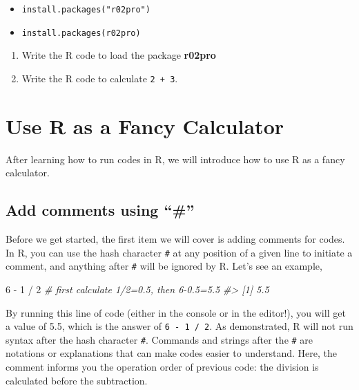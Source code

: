 \documentclass[
]{book}
\newenvironment{Shaded}{\begin{snugshade}}{\end{snugshade}}
\newcommand{\CommentTok}[1]{\textcolor[rgb]{0.56,0.35,0.01}{\textit{#1}}}
\newcommand{\DecValTok}[1]{\textcolor[rgb]{0.00,0.00,0.81}{#1}}
\newcommand{\SpecialCharTok}[1]{\textcolor[rgb]{0.00,0.00,0.00}{#1}}
\providecommand{\tightlist}{%
  \setlength{\itemsep}{0pt}\setlength{\parskip}{0pt}}
\begin{document}
\begin{itemize}
\tightlist
\item
  \texttt{install.packages("r02pro")}
\item
  \texttt{install.packages(r02pro)}
\end{itemize}

\begin{enumerate}
\def\labelenumi{\arabic{enumi}.}
\setcounter{enumi}{1}
\item
  Write the R code to load the package \textbf{r02pro}
\item
  Write the R code to calculate \texttt{2\ +\ 3}.
\end{enumerate}

\hypertarget{Calculator}{%
\section{Use R as a Fancy Calculator}\label{Calculator}}

After learning how to run codes in R, we will introduce how to use R as a fancy calculator.

\hypertarget{add-comments-using}{%
\subsection{Add comments using ``\#''}\label{add-comments-using}}

Before we get started, the first item we will cover is adding comments for codes. In R, you can use the hash character \texttt{\#} at any position of a given line to initiate a comment, and anything after \texttt{\#} will be ignored by R. Let's see an example,

\begin{Shaded}
\begin{Highlighting}[]
\DecValTok{6} \SpecialCharTok{{-}} \DecValTok{1} \SpecialCharTok{/} \DecValTok{2} \CommentTok{\# first calculate 1/2=0.5, then 6{-}0.5=5.5}
\CommentTok{\#\textgreater{} [1] 5.5}
\end{Highlighting}
\end{Shaded}

By running this line of code (either in the console or in the editor!), you will get a value of 5.5, which is the answer of \texttt{6\ -\ 1\ /\ 2}. As demonstrated, R will not run syntax after the hash character \texttt{\#}. Commands and strings after the \texttt{\#} are notations or explanations that can make codes easier to understand. Here, the comment informs you the operation order of previous code: the division is calculated before the subtraction.
\end{document}
